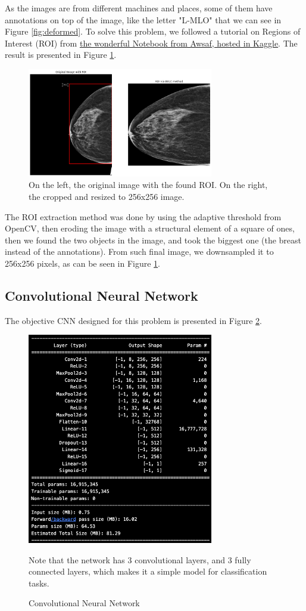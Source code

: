 \documentclass[conference]{IEEEtran}
\begin{document}
As the images are from different machines and places, some of them have annotations on top of the image, like the letter "L-MLO" that we can see in Figure \ref{fig:deformed}. To solve this problem, we followed a tutorial on Regions of Interest (ROI) from \href{https://www.kaggle.com/code/awsaf49/rsna-bcd-roi-methods-comparison}{the wonderful Notebook from Awsaf, hosted in Kaggle}. The result is presented in Figure \ref{fig:roi_belc}.

\begin{figure}[ht]
\centering
\includegraphics[width=3.2in]{ROI_based}
\caption{On the left, the original image with the found ROI. On the right, the cropped and resized to 256x256 image.}
\label{fig:roi_belc}
\end{figure}

The ROI extraction method was done by using the adaptive threshold from OpenCV, then eroding the image with a structural element of a square of ones, then we found the two objects in the image, and took the biggest one (the breast instead of the annotations). From such final image, we downsampled it to 256x256 pixels, as can be seen in Figure \ref{fig:roi_belc}.
\subsection{Convolutional Neural Network}

The objective CNN designed for this problem is presented in Figure \ref{fig:CNN}.

\begin{figure}[ht]
\centering
\includegraphics[width=3.2in]{CNN}
\caption{Convolutional Neural Network}
\label{fig:CNN}

Note that the network has 3 convolutional layers, and 3 fully connected layers, which makes it a simple model for classification tasks. 
\end{figure}
\end{document}
